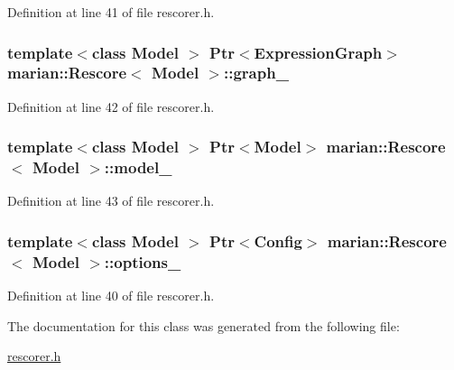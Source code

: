 Definition at line 41 of file rescorer.\+h.

\subsubsection[{\texorpdfstring{graph\+\_\+}{graph_}}]{\setlength{\rightskip}{0pt plus 5cm}template$<$class Model $>$ {\bf Ptr}$<${\bf Expression\+Graph}$>$ {\bf marian\+::\+Rescore}$<$ Model $>$\+::graph\+\_\+\hspace{0.3cm}{\ttfamily [private]}}\hypertarget{classmarian_1_1Rescore_a9f6d908e2c46c0b43ca16e61d3c4a618}{}\label{classmarian_1_1Rescore_a9f6d908e2c46c0b43ca16e61d3c4a618}


Definition at line 42 of file rescorer.\+h.

\subsubsection[{\texorpdfstring{model\+\_\+}{model_}}]{\setlength{\rightskip}{0pt plus 5cm}template$<$class Model $>$ {\bf Ptr}$<$Model$>$ {\bf marian\+::\+Rescore}$<$ Model $>$\+::model\+\_\+\hspace{0.3cm}{\ttfamily [private]}}\hypertarget{classmarian_1_1Rescore_a062b8a1e12c90dbc2b68a7321f8afb67}{}\label{classmarian_1_1Rescore_a062b8a1e12c90dbc2b68a7321f8afb67}


Definition at line 43 of file rescorer.\+h.

\subsubsection[{\texorpdfstring{options\+\_\+}{options_}}]{\setlength{\rightskip}{0pt plus 5cm}template$<$class Model $>$ {\bf Ptr}$<${\bf Config}$>$ {\bf marian\+::\+Rescore}$<$ Model $>$\+::options\+\_\+\hspace{0.3cm}{\ttfamily [private]}}\hypertarget{classmarian_1_1Rescore_a364be87ce2541f28ca6065e12955f789}{}\label{classmarian_1_1Rescore_a364be87ce2541f28ca6065e12955f789}


Definition at line 40 of file rescorer.\+h.



The documentation for this class was generated from the following file\+:\begin{DoxyCompactItemize}
\item 
\hyperlink{rescorer_8h}{rescorer.\+h}\end{DoxyCompactItemize}
